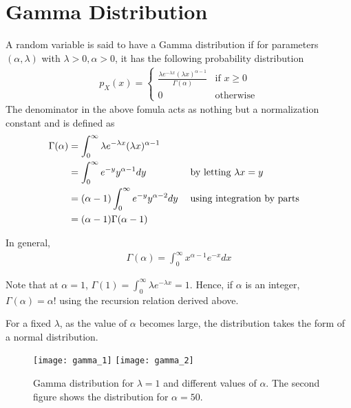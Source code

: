 \documentclass[../probability-notes.tex]{subfiles}
\begin{document}
    \section{Gamma Distribution}
    A random variable is said to have a Gamma distribution if for parameters $(\alpha, \lambda)$ with $\lambda > 0, \alpha > 0$, it has the following probability distribution
    \begin{align*}
        p_{X}(x) = \begin{cases}
            \frac{\lambda e^{-\lambda x} (\lambda x)^{\alpha - 1}}{\Gamma(\alpha)} &\mbox{if $x \geq 0$}\\
            0 &\mbox{otherwise}
        \end{cases}
    \end{align*}
    The denominator in the above fomula acts as nothing but a normalization constant and is defined as
    \begin{alignat*}{2}
        \Gamma (\alpha) &= \int_{0}^{\infty} \lambda e^{-\lambda x} (\lambda x)^{\alpha - 1}\\
        &= \int_{0}^{\infty} e^{-y} y^{\alpha - 1} dy &&\text{\;by letting $\lambda x = y$}\\
        &= (\alpha - 1) \int_{0}^{\infty} e^{-y} y^{\alpha - 2} dy &&\text{\;using integration by parts}\\
        &= (\alpha - 1) \Gamma (\alpha - 1)
    \end{alignat*}

    In general,
    \begin{align*}
        \Gamma(\alpha) = \int_{0}^{\infty} x^{\alpha - 1}e^{-x}dx
    \end{align*}

    Note that at $\alpha = 1$, $\Gamma (1) = \int_{0}^{\infty} \lambda e^{-\lambda x} = 1$. Hence, if $\alpha$ is an integer, $\Gamma(\alpha) = \alpha !$ using the recursion relation derived above.\newline

    For a fixed $\lambda$, as the value of $\alpha$ becomes large, the distribution takes the form of a normal distribution.

    \begin{figure}[h]
    \texttt{[image: gamma\_1]}
    \texttt{[image: gamma\_2]}
    \centering
    \caption{Gamma distribution for $\lambda = 1$ and different values of $\alpha$. The second figure shows the distribution for $\alpha = 50$.}
    \label{fig:gamma_1} %
    \end{figure}
\end{document}
